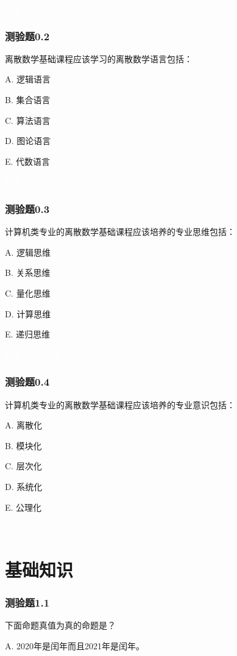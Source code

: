 \documentclass[UTF8, heading=true]{ctexart}
\begin{document}
\textcolor{white}{答案：ABD}

\subsubsection{测验题0.2}

离散数学基础课程应该学习的离散数学语言包括：

A. 逻辑语言

B. 集合语言

C. 算法语言

D. 图论语言

E. 代数语言

\textcolor{white}{答案：ABCDE}

\subsubsection{测验题0.3}

计算机类专业的离散数学基础课程应该培养的专业思维包括：

A. 逻辑思维

B. 关系思维

C. 量化思维

D. 计算思维

E. 递归思维

\textcolor{white}{答案：ABCDE}

\subsubsection{测验题0.4}

计算机类专业的离散数学基础课程应该培养的专业意识包括：

A. 离散化

B. 模块化

C. 层次化

D. 系统化

E. 公理化

\textcolor{white}{答案：ABCDE}

\clearpage

\section{基础知识}

\subsubsection{测验题1.1}

下面命题真值为真的命题是？

A. 2020年是闰年而且2021年是闰年。
\end{document}
